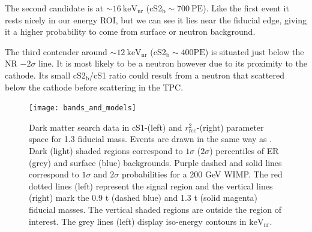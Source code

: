 The second candidate is at ${\sim} 16\ \mathrm{keV_{nr}}$ (cS2$_{\mathrm{b}} \sim 700\ \mathrm{PE}$).  Like the first event it
rests nicely in our energy ROI, but we can see it lies near the fiducial edge, giving it a higher probability to come from surface or
neutron background.

The third contender around ${\sim} 12\ \mathrm{keV_{nr}}$ (cS2$_{\mathrm{b}} \sim 400 \mathrm{PE}$) is situated just below the NR
$-2 \sigma$ line.  It is most likely to be a neutron however due to its proximity to the cathode.  Its small cS2$_{\mathrm{b}}$/cS1
ratio could result from a neutron that scattered below the cathode before scattering in the TPC.

\begin{figure}
\centering
\texttt{[image: bands\_and\_models]}
\caption{Dark matter search data in cS1-\cstwob (left) and $r_{\mathrm{rec}}^2$-\cstwob (right) parameter space for 1.3 fiducial
mass.  Events are drawn in the same way as .  Dark (light) shaded regions correspond to
$1 \sigma$ ($2 \sigma$) percentiles of ER (grey) and surface (blue) backgrounds.  Purple dashed and solid lines
correspond to $1 \sigma$ and $2 \sigma$ probabilities for a 200 GeV WIMP.  The red dotted lines (left) represent the signal region
and the vertical lines (right) mark the 0.9 t (dashed blue) and 1.3 t (solid magenta) fiducial masses.  The vertical shaded
regions are outside the region of interest.  The grey lines (left) display iso-energy contours in $\mathrm{keV_{nr}}$.}
\label{fig:dark_matter_results_bands}
\end{figure}